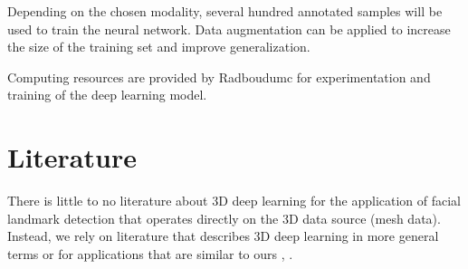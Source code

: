 \documentclass{article}
\begin{document}
Depending on the chosen modality, several hundred annotated samples will be used to train the neural network. Data augmentation can be applied to increase the size of the training set and improve generalization.

Computing resources are provided by Radboudumc for experimentation and training of the deep learning model.


\section{Literature}
There is little to no literature about 3D deep learning for the application of facial landmark detection that operates directly on the 3D data source (mesh data). Instead, we rely on literature that describes 3D deep learning in more general terms or for applications that are similar to ours \cite{Guo2020}, \cite{Bello2020}.
\end{document}
